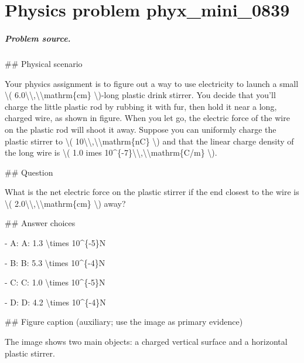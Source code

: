 
\chapter{Physics problem phyx\_mini\_0839}
\label{ch:PhyXMiniProblems_problem_phyx_mini_0839}

\paragraph{Problem source.}
\#\# Physical scenario

Your physics assignment is to figure out a way to use electricity to launch a small \textbackslash{}( 6.0\textbackslash{}\textbackslash{},\textbackslash{}\textbackslash{}mathrm\{cm\} \textbackslash{})-long plastic drink stirrer. You decide that you'll charge the little plastic rod by rubbing it with fur, then hold it near a long, charged wire, as shown in figure. When you let go, the electric force of the wire on the plastic rod will shoot it away. Suppose you can uniformly charge the plastic stirrer to \textbackslash{}( 10\textbackslash{}\textbackslash{},\textbackslash{}\textbackslash{}mathrm\{nC\} \textbackslash{}) and that the linear charge density of the long wire is \textbackslash{}( 1.0 	imes 10\textasciicircum{}\{-7\}\textbackslash{}\textbackslash{},\textbackslash{}\textbackslash{}mathrm\{C/m\} \textbackslash{}).

\#\# Question

What is the net electric force on the plastic stirrer if the end closest to the wire is \textbackslash{}( 2.0\textbackslash{}\textbackslash{},\textbackslash{}\textbackslash{}mathrm\{cm\} \textbackslash{}) away?

\#\# Answer choices

- A: A: 1.3 \textbackslash{}times 10\textasciicircum{}\{-5\}N

- B: B: 5.3 \textbackslash{}times 10\textasciicircum{}\{-4\}N

- C: C: 1.0 \textbackslash{}times 10\textasciicircum{}\{-5\}N

- D: D: 4.2 \textbackslash{}times 10\textasciicircum{}\{-4\}N

\#\# Figure caption (auxiliary; use the image as primary evidence)

The image shows two main objects: a charged vertical surface and a horizontal plastic stirrer.

